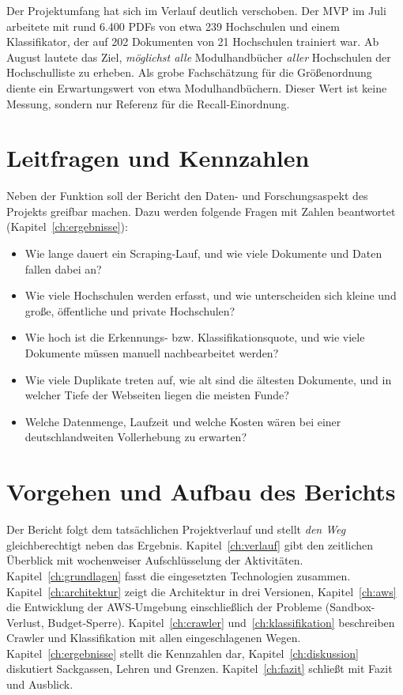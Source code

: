 Der Projektumfang hat sich im Verlauf deutlich verschoben. Der MVP im Juli arbeitete mit rund 6.400 PDFs von etwa 239 Hochschulen und einem Klassifikator, der auf 202 Dokumenten von 21 Hochschulen trainiert war. Ab August lautete das Ziel, \emph{möglichst alle} Modulhandbücher \emph{aller} \zUnisTotal{} Hochschulen der Hochschulliste zu erheben. Als grobe Fachschätzung für die Größenordnung diente ein Erwartungswert von etwa \zZielwert{} Modulhandbüchern. Dieser Wert ist keine Messung, sondern nur Referenz für die Recall-Einordnung.

\section{Leitfragen und Kennzahlen}
Neben der Funktion soll der Bericht den Daten- und Forschungsaspekt des Projekts greifbar machen. Dazu werden folgende Fragen mit Zahlen beantwortet (Kapitel~\ref{ch:ergebnisse}):
\begin{itemize}
  \item Wie lange dauert ein Scraping-Lauf, und wie viele Dokumente und Daten fallen dabei an?
  \item Wie viele Hochschulen werden erfasst, und wie unterscheiden sich kleine und große, öffentliche und private Hochschulen?
  \item Wie hoch ist die Erkennungs- bzw. Klassifikationsquote, und wie viele Dokumente müssen manuell nachbearbeitet werden?
  \item Wie viele Duplikate treten auf, wie alt sind die ältesten Dokumente, und in welcher Tiefe der Webseiten liegen die meisten Funde?
  \item Welche Datenmenge, Laufzeit und welche Kosten wären bei einer deutschlandweiten Vollerhebung zu erwarten?
\end{itemize}

\section{Vorgehen und Aufbau des Berichts}
Der Bericht folgt dem tatsächlichen Projektverlauf und stellt \emph{den Weg} gleichberechtigt neben das Ergebnis. Kapitel~\ref{ch:verlauf} gibt den zeitlichen Überblick mit wochenweiser Aufschlüsselung der Aktivitäten. Kapitel~\ref{ch:grundlagen} fasst die eingesetzten Technologien zusammen. Kapitel~\ref{ch:architektur} zeigt die Architektur in drei Versionen, Kapitel~\ref{ch:aws} die Entwicklung der AWS-Umgebung einschließlich der Probleme (Sandbox-Verlust, Budget-Sperre). Kapitel~\ref{ch:crawler} und~\ref{ch:klassifikation} beschreiben Crawler und Klassifikation mit allen eingeschlagenen Wegen. Kapitel~\ref{ch:ergebnisse} stellt die Kennzahlen dar, Kapitel~\ref{ch:diskussion} diskutiert Sackgassen, Lehren und Grenzen. Kapitel~\ref{ch:fazit} schließt mit Fazit und Ausblick.

